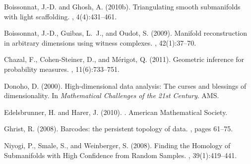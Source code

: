 % 
% 


\begin{thebibliography}{}
\vspace{-2mm}

{\footnotesize

Boissonnat, J.-D. and Ghosh, A. (2010b).
\newblock Triangulating smooth submanifolds with light scaffolding.
, 4(4):431--461.
\vspace{-2mm}

Boissonnat, J.-D., Guibas, L.~J., and Oudot, S. (2009).
\newblock Manifold reconstruction in arbitrary dimensions using witness
  complexes.
, 42(1):37--70.
\vspace{-2mm}

Chazal, F., Cohen-Steiner, D., and M\'erigot, Q. (2011).
\newblock Geometric inference for probability measures.
,
  11(6):733--751.
\vspace{-2mm}

Donoho, D. (2000).
\newblock High-dimensional data analysis: The curses and blessings of
  dimensionality.
\newblock In {\em Mathematical Challenges of the 21st Century}. AMS.
\vspace{-2mm}

Edelsbrunner, H. and Harer, J. (2010).
.
\newblock American Mathematical Society.
\vspace{-2mm}

Ghrist, R. (2008).
\newblock Barcodes: the persistent topology of data.
, pages 61--75.
\vspace{-2mm}

Niyogi, P., Smale, S., and Weinberger, S. (2008).
\newblock Finding the {H}omology of {S}ubmanifolds with {H}igh {C}onfidence
  from {R}andom {S}amples.
, 39(1):419--441.

}

\end{thebibliography}
